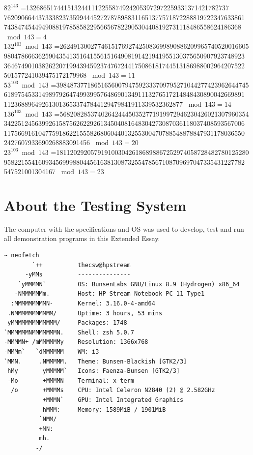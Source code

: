 \documentclass[a4paper, 12pt]{article}
\begin{document}
$82 ^ {143}$ =13268651744151324411122558749242053972972259331371421782737
7620906644373338237359944452727878988311651377571872288819722347633861
743847454494908819785858229566567822905304408192731118486558624186368
$\bmod 143 = 4$\\

$132^ {103} \bmod 143$ =2624913002774615176927425083699890886209965740520016605
9804786663625904354135164155615164908191421941955130375650907923748923
3646749010382622071994394592374767244175086181744513186988002964207522
501577241039475172179968 $\bmod 143 = 11$\\

$53^ {103} \bmod 143$ =39848737718651656007947592333709795271044277423962644745
6189754533149897926474993995764869013491113276517214848430890042669891
1123688964926130136533747844129479841911339532362877 $\bmod 143 = 14$\\

$136 ^{103} \bmod 143$ =5682082853740264244450352771919972946230426021307960354
3422512456399261587562622926134504081648304273087036118037408593567006
1175669161047759186221555826806044013255300470788548878847931178036550
2427607933690268883091456 $\bmod 143 = 20$\\

$23 ^{103} \bmod 143$ =18112029205791910030426186898867252974058728482780125280
9582215541609345699988044561638130873255478567108709697047335431227782
547521001304167 $\bmod 143 = 23$\\


\newpage

\section{About the Testing System}
\label{specs}
The computer with the specifications and OS\cite{BunsenLabs}\cite{Debian} was used to develop, test and run all demonstration
programs\cite{github} in this Extended Essay.

\begin{lstlisting}[caption=System Specifications]
  ~ neofetch
        `++          thecsw@hpstream
      -yMMs          ---------------
    `yMMMMN`         OS: BunsenLabs GNU/Linux 8.9 (Hydrogen) x86_64
   -NMMMMMMm.        Host: HP Stream Notebook PC 11 Type1 
  :MMMMMMMMMN-       Kernel: 3.16.0-4-amd64
 .NMMMMMMMMMMM/      Uptime: 3 hours, 53 mins
 yMMMMMMMMMMMMM/     Packages: 1748
`MMMMMMNMMMMMMMN.    Shell: zsh 5.0.7
-MMMMN+ /mMMMMMMy    Resolution: 1366x768
-MMMm`   `dMMMMMM    WM: i3
`MMN.     .NMMMMM.   Theme: Bunsen-Blackish [GTK2/3]
 hMy       yMMMMM`   Icons: Faenza-Bunsen [GTK2/3]
 -Mo       +MMMMN    Terminal: x-term
  /o       +MMMMs    CPU: Intel Celeron N2840 (2) @ 2.582GHz
           +MMMN`    GPU: Intel Integrated Graphics
           hMMM:     Memory: 1589MiB / 1901MiB
          `NMM/ 
          +MN:                               
          mh. 
         -/          
  \end{lstlisting}
\end{document}
